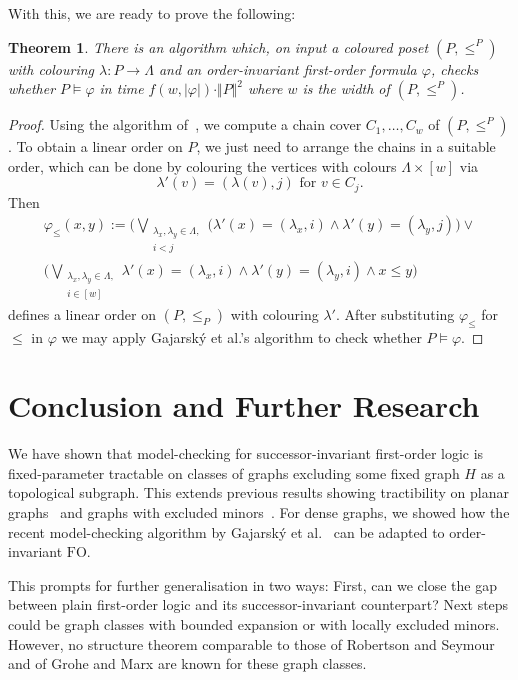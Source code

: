 \documentclass[12pt]{amsart}
\newtheorem{theorem}{Theorem}[section]
\newcommand{\FO}{\textrm{FO}}
\begin{document}
With this, we are ready to prove the following:
\begin{theorem}
  There is an algorithm which, on input a coloured poset $(P,\leq^P)$
  with colouring $\lambda : P \to \Lambda$ and an order-invariant
  first-order formula $\varphi$, checks whether $P \models \varphi$ in
  time $f(w,|\varphi|) \cdot \Vert P\Vert^2$ where $w$ is the width of
  $(P,\leq^P)$.
\end{theorem}
\begin{proof}
  Using the algorithm of~\cite{felsner2003recognition}, we compute a
  chain cover $C_1,\ldots,C_w$ of $(P,\leq^P)$. To obtain a linear
  order on $P$, we just need to arrange the chains in a suitable
  order, which can be done by colouring the vertices with colours
  $\Lambda \times [w]$ via
  \[
  \lambda'(v) = (\lambda(v), j)\text{ for }v \in C_j.
  \]
  Then
  \begin{multline*}
  \varphi_\leq(x,y) := \bigg(\bigvee_{\substack{\lambda_x,\lambda_y \in \Lambda,\\i <
    j}} (\lambda'(x) = (\lambda_x,i) \wedge \lambda'(y) = (\lambda_y,j)
  \bigg)
  \vee
  \\
  \bigg(\bigvee_{\substack{\lambda_x,\lambda_y \in \Lambda,\\i \in [w]}} \lambda'(x)
  = (\lambda_x,i)
  \wedge
  \lambda'(y) = (\lambda_y,i)
  \wedge
  x \leq y
  \bigg)
  \end{multline*}
  defines a linear order on $(P,\leq_P)$ with colouring
  $\lambda'$. After substituting $\varphi_\leq$ for $\leq$ in
  $\varphi$ we may apply Gajarský et al.'s algorithm to check whether
  $P \models \varphi$.
\end{proof}


\section*{Conclusion and Further Research}

We have shown that model-checking for successor-invariant first-order
logic is fixed-parameter tractable on classes of graphs excluding some
fixed graph $H$ as a topological subgraph. This extends previous
results showing tractibility on planar graphs~\cite{EngelmannKS12} and
graphs with excluded minors~\cite{ekk13}. For dense graphs, we showed
how the recent model-checking algorithm by Gajarský et
al.~\cite{gajarsky2015fo} can be adapted to order-invariant $\FO$.

This prompts for further generalisation in two ways: First, can we
close the gap between plain first-order logic and its
successor-invariant counterpart? Next steps could be graph classes
with bounded expansion or with locally excluded minors. However, no
structure theorem comparable to those of Robertson and Seymour and of
Grohe and Marx are known for these graph classes.
\end{document}
